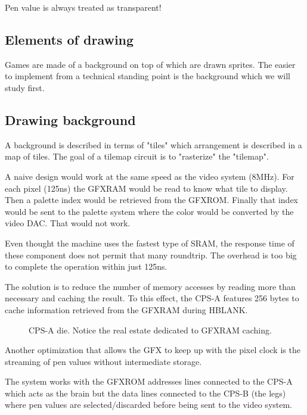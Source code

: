  \begin{trivia}
 Pen value  is always treated as transparent!
 \end{trivia}



\subsection{Elements of drawing}

Games are made of a background on top of which are drawn sprites. The easier to implement from a technical standing point is the background which we will study first.

\subsection{Drawing background}

A background is described in terms of "tiles" which arrangement is described in a map of tiles. The goal of a tilemap circuit is to "rasterize" the "tilemap".

A naive design would work at the same speed as the video system (8MHz). For each pixel (125ns) the GFXRAM would be read to know what tile to display. Then a palette index would be retrieved from the GFXROM. Finally that index would be sent to the palette system where the color would be converted by the video DAC. That would not work.

Even thought the machine uses the fastest type of SRAM, the response time of these component does not permit that many roundtrip. The overhead is too big to complete the operation within just 125ns.

The solution is to reduce the number of memory accesses by reading more than necessary and caching the result. To this effect, the CPS-A features 256 bytes to cache information retrieved from the GFXRAM during HBLANK.

 \begin{figure}[H]%
 \caption*{CPS-A die. Notice the real estate dedicated to GFXRAM caching.}%
 \end{figure}%



Another optimization that allows the GFX to keep up with the pixel clock is the streaming of pen values without intermediate storage. 

The system works with the GFXROM addresses lines connected to the CPS-A which acts as the brain but the data lines  connected to the CPS-B (the legs) where pen values are selected/discarded before being sent to the video system.

